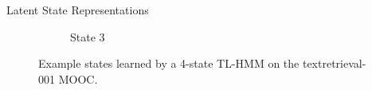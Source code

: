\documentclass[final,t]{beamer}
\newcommand{\textretrieval}{textretrieval-001}
\begin{document}
\begin{frame}[fragile]
\begin{columns}[t]
\begin{column}{0.3\textwidth}
\begin{block}{Latent State Representations}
\begin{figure}
\begin{subfigure}[t]{0.9\textwidth}
            \caption{\label{fig:state3}State 3}
          \end{subfigure}
          \caption{Example states learned by a 4-state TL-HMM on the
          \textretrieval{} MOOC.}
          \label{fig:states}
        \end{figure}
      \end{block}
    \end{column}
  \end{columns}
\end{frame}
\end{document}
